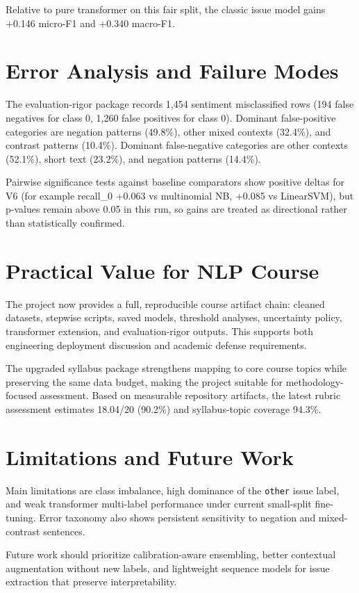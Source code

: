 \documentclass[12pt,a4paper]{article}
\begin{document}
Relative to pure transformer on this fair split, the classic issue model gains +0.146 micro-F1 and +0.340 macro-F1.

\section{Error Analysis and Failure Modes}
The evaluation-rigor package records 1,454 sentiment misclassified rows (194 false negatives for class 0, 1,260 false positives for class 0). Dominant false-positive categories are negation patterns (49.8\%), other mixed contexts (32.4\%), and contrast patterns (10.4\%). Dominant false-negative categories are other contexts (52.1\%), short text (23.2\%), and negation patterns (14.4\%).

Pairwise significance tests against baseline comparators show positive deltas for V6 (for example recall\_0 +0.063 vs multinomial NB, +0.085 vs LinearSVM), but p-values remain above 0.05 in this run, so gains are treated as directional rather than statistically confirmed.

\section{Practical Value for NLP Course}
The project now provides a full, reproducible course artifact chain: cleaned datasets, stepwise scripts, saved models, threshold analyses, uncertainty policy, transformer extension, and evaluation-rigor outputs. This supports both engineering deployment discussion and academic defense requirements.

The upgraded syllabus package strengthens mapping to core course topics while preserving the same data budget, making the project suitable for methodology-focused assessment. Based on measurable repository artifacts, the latest rubric assessment estimates 18.04/20 (90.2\%) and syllabus-topic coverage 94.3\%.

\section{Limitations and Future Work}
Main limitations are class imbalance, high dominance of the \texttt{other} issue label, and weak transformer multi-label performance under current small-split fine-tuning. Error taxonomy also shows persistent sensitivity to negation and mixed-contrast sentences.

Future work should prioritize calibration-aware ensembling, better contextual augmentation without new labels, and lightweight sequence models for issue extraction that preserve interpretability.
\end{document}
